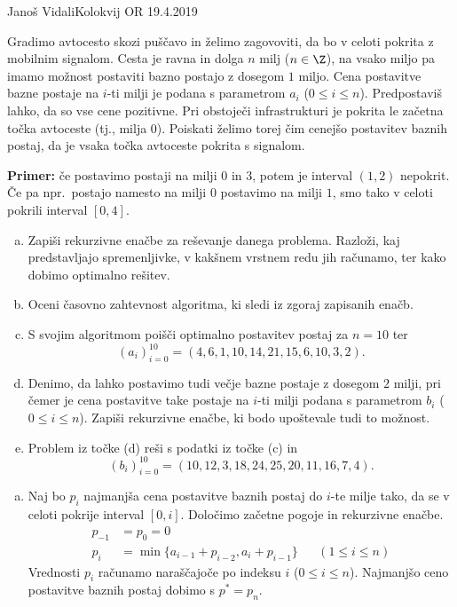 \begin{naloga}{Janoš Vidali}{Kolokvij OR 19.4.2019}
\begin{vprasanje}
Gradimo avtocesto skozi puščavo in želimo zagovoviti,
da bo v celoti pokrita z mobilnim signalom.
Cesta je ravna in dolga $n$ milj ($n \in \Z$),
na vsako miljo pa imamo možnost postaviti bazno postajo z dosegom $1$ miljo.
Cena postavitve bazne postaje na $i$-ti milji
je podana s parametrom $a_i$ ($0 \le i \le n$).
Predpostaviš lahko, da so vse cene pozitivne.
Pri obstoječi infrastrukturi je pokrita le začetna točka avtoceste
(tj., milja $0$).
Poiskati želimo torej čim cenejšo postavitev baznih postaj,
da je vsaka točka avtoceste pokrita s signalom.

\medskip
\noindent
{\bf Primer:} če postavimo postaji na milji $0$ in $3$,
potem je interval $(1, 2)$ nepokrit.
Če pa npr.~postajo namesto na milji $0$ postavimo na milji $1$,
smo tako v celoti pokrili interval $[0, 4]$.

\begin{enumerate}[(a)]
\item Zapiši rekurzivne enačbe za reševanje danega problema.
Razloži, kaj pred\-stav\-lja\-jo spremenljivke,
v kakšnem vrstnem redu jih računamo,
ter kako dobimo optimalno rešitev.

\item Oceni časovno zahtevnost algoritma, ki sledi iz zgoraj zapisanih enačb.

\item S svojim algoritmom poišči optimalno postavitev postaj za $n = 10$ ter
$$
(a_i)_{i=0}^{10} = (4,  6,  1, 10, 14, 21, 15,  6, 10,  3,  2) .
$$

\item Denimo, da lahko postavimo tudi večje bazne postaje z dosegom $2$ milji,
pri čemer je cena postavitve take postaje na $i$-ti milji
podana s parametrom $b_i$ ($0 \le i \le n$).
Zapiši rekurzivne enačbe, ki bodo upoštevale tudi to možnost.

\item Problem iz točke (d) reši s podatki iz točke (c) in
$$
(b_i)_{i=0}^{10} = (10, 12, 3, 18, 24, 25, 20, 11, 16,  7,  4) .
$$
\end{enumerate}
\end{vprasanje}

\begin{odgovor}
\begin{enumerate}[(a)]
\item Naj bo $p_i$ najmanjša cena postavitve baznih postaj
do $i$-te milje tako,
da se v celoti pokrije interval $[0, i]$.
Določimo začetne pogoje in rekurzivne enačbe.
\begin{align*}
p_{-1} &= p_0 = 0 \\
p_i &= \min\{a_{i-1} + p_{i-2}, a_i + p_{i-1}\} && (1 \le i \le n)
\end{align*}
Vrednosti $p_i$ računamo naraščajoče po indeksu $i$ ($0 \le i \le n$).
Najmanjšo ceno postavitve baznih postaj dobimo s $p^* = p_n$.


\end{enumerate}
\end{odgovor}
\end{naloga}
